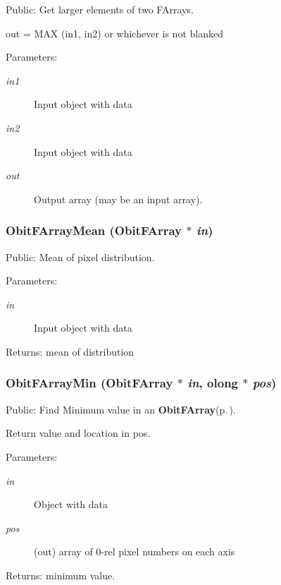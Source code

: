 Public: Get larger elements of two FArrays. 

out = MAX (in1, in2) or whichever is not blanked \begin{Desc}
\item[Parameters:]
\begin{description}
\item[{\em in1}]Input object with data \item[{\em in2}]Input object with data \item[{\em out}]Output array (may be an input array). \end{description}
\end{Desc}
\subsubsection{ Obit\-FArray\-Mean ({\bf Obit\-FArray} $\ast$ {\em in})}\label{ObitFArray_8c_a34}


Public: Mean of pixel distribution. 

\begin{Desc}
\item[Parameters:]
\begin{description}
\item[{\em in}]Input object with data \end{description}
\end{Desc}
\begin{Desc}
\item[Returns:]mean of distribution \end{Desc}
\subsubsection{ Obit\-FArray\-Min ({\bf Obit\-FArray} $\ast$ {\em in}, {\bf olong} $\ast$ {\em pos})}\label{ObitFArray_8c_a26}


Public: Find Minimum value in an {\bf Obit\-FArray}{\rm (p.\,\pageref{structObitFArray})}. 

Return value and location in pos. \begin{Desc}
\item[Parameters:]
\begin{description}
\item[{\em in}]Object with data \item[{\em pos}](out) array of 0-rel pixel numbers on each axis \end{description}
\end{Desc}
\begin{Desc}
\item[Returns:]minimum value. \end{Desc}
